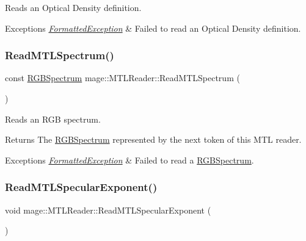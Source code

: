 Reads an Optical Density definition.


\begin{DoxyExceptions}{Exceptions}
{\em \hyperlink{structmage_1_1_formatted_exception}{Formatted\+Exception}} & Failed to read an Optical Density definition. \\
\hline
\end{DoxyExceptions}
\hypertarget{classmage_1_1_m_t_l_reader_a607a55ab2e68d3bc9b879d7e3377f0e3}{}\label{classmage_1_1_m_t_l_reader_a607a55ab2e68d3bc9b879d7e3377f0e3} 
\subsubsection{\texorpdfstring{Read\+M\+T\+L\+Spectrum()}{ReadMTLSpectrum()}}
{\footnotesize\ttfamily const \hyperlink{structmage_1_1_r_g_b_spectrum}{R\+G\+B\+Spectrum} mage\+::\+M\+T\+L\+Reader\+::\+Read\+M\+T\+L\+Spectrum (\begin{DoxyParamCaption}{ }\end{DoxyParamCaption})\hspace{0.3cm}{\ttfamily [private]}}

Reads an R\+GB spectrum.

\begin{DoxyReturn}{Returns}
The {\ttfamily \hyperlink{structmage_1_1_r_g_b_spectrum}{R\+G\+B\+Spectrum}} represented by the next token of this M\+TL reader. 
\end{DoxyReturn}

\begin{DoxyExceptions}{Exceptions}
{\em \hyperlink{structmage_1_1_formatted_exception}{Formatted\+Exception}} & Failed to read a {\ttfamily \hyperlink{structmage_1_1_r_g_b_spectrum}{R\+G\+B\+Spectrum}}. \\
\hline
\end{DoxyExceptions}
\hypertarget{classmage_1_1_m_t_l_reader_a0ac9c6202ff7fa921d551e1aaa59b33f}{}\label{classmage_1_1_m_t_l_reader_a0ac9c6202ff7fa921d551e1aaa59b33f} 
\subsubsection{\texorpdfstring{Read\+M\+T\+L\+Specular\+Exponent()}{ReadMTLSpecularExponent()}}
{\footnotesize\ttfamily void mage\+::\+M\+T\+L\+Reader\+::\+Read\+M\+T\+L\+Specular\+Exponent (\begin{DoxyParamCaption}{ }\end{DoxyParamCaption})\hspace{0.3cm}{\ttfamily [private]}}

